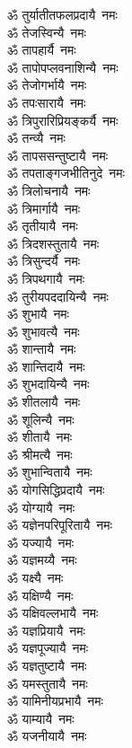 \begin{flushleft}
\begin{multicols}{2}
ॐ तुर्यातीतफलप्रदायै~नमः\\
ॐ तेजस्विन्यै~नमः\\
ॐ तापहार्यै~नमः\\
ॐ तापोपप्लवनाशिन्यै~नमः\\
ॐ तेजोगर्भायै~नमः\\
ॐ तपःसारायै~नमः\hfill{}\\
ॐ त्रिपुरारिप्रियङ्कर्यै~नमः\\
ॐ तन्व्यै~नमः\\
ॐ तापससन्तुष्टायै~नमः\\
ॐ तपताङ्गजभीतिनुदे~नमः\\
ॐ त्रिलोचनायै~नमः\\
ॐ त्रिमार्गायै~नमः\\
ॐ तृतीयायै~नमः\\
ॐ त्रिदशस्तुतायै~नमः\\
ॐ त्रिसुन्दर्यै~नमः\\
ॐ त्रिपथगायै~नमः\hfill{}\\
ॐ तुरीयपददायिन्यै~नमः\\
ॐ शुभायै~नमः\\
ॐ शुभावत्यै~नमः\\
ॐ शान्तायै~नमः\\
ॐ शान्तिदायै~नमः\\
ॐ शुभदायिन्यै~नमः\\
ॐ शीतलायै~नमः\\
ॐ शूलिन्यै~नमः\\
ॐ शीतायै~नमः\\
ॐ श्रीमत्यै~नमः\hfill{}\\
ॐ शुभान्वितायै~नमः\\
ॐ योगसिद्धिप्रदायै~नमः\\
ॐ योग्यायै~नमः\\
ॐ यज्ञेनपरिपूरितायै~नमः\\
ॐ यज्यायै~नमः\\
ॐ यज्ञमय्यै~नमः\\
ॐ यक्ष्यै~नमः\\
ॐ यक्षिण्यै~नमः\\
ॐ यक्षिवल्लभायै~नमः\\
ॐ यज्ञप्रियायै~नमः\hfill{}\\
ॐ यज्ञपूज्यायै~नमः\\
ॐ यज्ञतुष्टायै~नमः\\
ॐ यमस्तुतायै~नमः\\
ॐ यामिनीयप्रभायै~नमः\\
ॐ याम्यायै~नमः\\
ॐ यजनीयायै~नमः\\

\end{multicols}
\end{flushleft}
